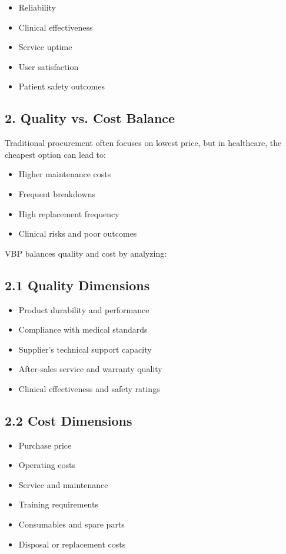 \documentclass[10pt]{article}
\begin{document}
\begin{itemize}
  \item Reliability
  \item Clinical effectiveness
  \item Service uptime
  \item User satisfaction
  \item Patient safety outcomes
\end{itemize}

\subsection*{2. Quality vs. Cost Balance}
Traditional procurement often focuses on lowest price, but in healthcare, the cheapest option can lead to:

\begin{itemize}
  \item Higher maintenance costs
  \item Frequent breakdowns
  \item High replacement frequency
  \item Clinical risks and poor outcomes
\end{itemize}

VBP balances quality and cost by analyzing:

\subsection*{2.1 Quality Dimensions}
\begin{itemize}
  \item Product durability and performance
  \item Compliance with medical standards
  \item Supplier's technical support capacity
  \item After-sales service and warranty quality
  \item Clinical effectiveness and safety ratings
\end{itemize}

\subsection*{2.2 Cost Dimensions}
\begin{itemize}
  \item Purchase price
  \item Operating costs
  \item Service and maintenance
  \item Training requirements
  \item Consumables and spare parts
  \item Disposal or replacement costs
\end{itemize}
\end{document}
